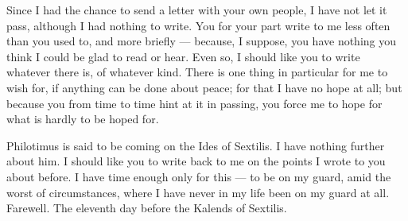 

 Since I had the chance to send a letter with your own people, I have not let it pass, although I had nothing to write. You for your part write to me less often than you used to, and more briefly --- because, I suppose, you have nothing you think I could be glad to read or hear. Even so, I should like you to write whatever there is, of whatever kind. There is one thing in particular for me to wish for, if anything can be done about peace; for that I have no hope at all; but because you from time to time hint at it in passing, you force me to hope for what is hardly to be hoped for.

 Philotimus is said to be coming on the Ides of Sextilis. I have nothing further about him. I should like you to write back to me on the points I wrote to you about before. I have time enough only for this --- to be on my guard, amid the worst of circumstances, where I have never in my life been on my guard at all. Farewell. The eleventh day before the Kalends of Sextilis.
